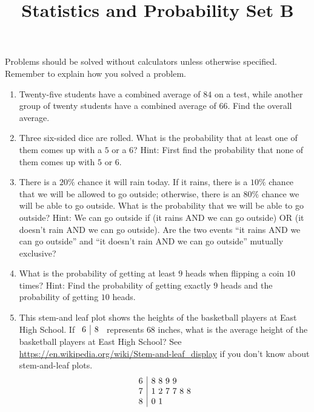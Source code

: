 \documentclass{article}
\title{Statistics and Probability Set B}
\author{}
\date{}
\begin{document}
\maketitle
\noindent Problems should be solved without calculators unless otherwise
specified.  Remember to explain how you solved a problem.
\begin{enumerate}
    \item Twenty-five students have a combined average of $84$ on a test, while
        another group of twenty students have a combined average of $66$. Find
        the overall average.
        \vspace{3cm}
    \item Three six-sided dice are rolled. What is the probability that at least
        one of them comes up with a $5$ or a $6$? Hint: First find the
        probability that none of them comes up with $5$ or $6$.
        \vspace{3cm}
    \item There is a $20\%$ chance it will rain today. If it rains, there is a
        $10\%$ chance that we will be allowed to go outside; otherwise, there is
        an $80\%$ chance we will be able to go outside. What is the probability
        that we will be able to go outside? Hint: We can go outside if (it rains
        AND we can go outside) OR (it doesn't rain AND we can go outside). Are
        the two events ``it rains AND we can go outside'' and ``it doesn't rain
        AND we can go outside'' mutually exclusive?
        \vspace{3cm}
    \item What is the probability of getting at least $9$ heads when flipping a
        coin $10$ times? Hint: Find the probability of getting exactly $9$ heads
        and the probability of getting $10$ heads.
        \vspace{3cm}
    \item This stem-and leaf plot shows the heights of the basketball players at
        East High School. If $\begin{array}{r | l} 6 & 8 \end{array}$ represents 
        $68$ inches, what is the average height of the basketball players at 
        East High School? See        
        \url{https://en.wikipedia.org/wiki/Stem-and-leaf_display} if you don't 
        know about stem-and-leaf plots.
        \[
            \begin{array}{r | l}
                6 & 8~8~9~9 \\
                7 & 1~2~7~7~8~8 \\
                8 & 0~1
            \end{array}
        \]
        \vspace{3cm}
\end{enumerate}
\end{document}
